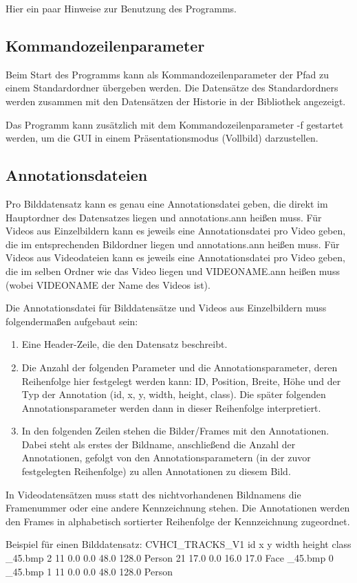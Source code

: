 Hier ein paar Hinweise zur Benutzung des Programms.

\subsection{Kommandozeilenparameter}
Beim Start des Programms kann als Kommandozeilenparameter der Pfad zu einem Standardordner übergeben werden. Die Datensätze des Standardordners werden zusammen mit den Datensätzen der Historie in der Bibliothek angezeigt.

Das Programm kann zusätzlich mit dem Kommandozeilenparameter -f gestartet werden, um die GUI in einem Präsentationsmodus (Vollbild) darzustellen.

\subsection{Annotationsdateien}
Pro Bilddatensatz kann es genau eine Annotationsdatei geben, die direkt im Hauptordner des Datensatzes liegen und annotations.ann heißen muss. \newline
Für Videos aus Einzelbildern kann es jeweils eine Annotationsdatei pro Video geben, die im entsprechenden Bildordner liegen und annotations.ann heißen muss. \newline
Für Videos aus Videodateien kann es jeweils eine Annotationsdatei pro Video geben, die im selben Ordner wie das Video liegen und VIDEONAME.ann heißen muss (wobei VIDEONAME der Name des Videos ist).

Die Annotationsdatei für Bilddatensätze und Videos aus Einzelbildern muss folgendermaßen aufgebaut sein:
\begin{enumerate}
\item Eine Header-Zeile, die den Datensatz beschreibt.
\item Die Anzahl der folgenden Parameter und die Annotationsparameter, deren Reihenfolge hier festgelegt werden kann: ID, Position, Breite, Höhe und der Typ der Annotation (id, x, y, width, height, class). Die später folgenden Annotationsparameter werden dann in dieser Reihenfolge interpretiert.
\item In den folgenden Zeilen stehen die Bilder/Frames mit den Annotationen. Dabei steht als erstes der Bildname, anschließend die Anzahl der Annotationen, gefolgt von den Annotationsparametern (in der zuvor festgelegten Reihenfolge) zu allen Annotationen zu diesem Bild.
\end{enumerate}

In Videodatensätzen muss statt des nichtvorhandenen Bildnamens die Framenummer oder eine andere Kennzeichnung stehen. Die Annotationen werden den Frames in alphabetisch sortierter Reihenfolge der Kennzeichnung zugeordnet.

Beispiel für einen Bilddatensatz: \newline\newline
CVHCI\_TRACKS\_V1  id x y width height class \_45.bmp 2 11 0.0 0.0 48.0 128.0 Person 21 17.0 0.0 16.0 17.0 Face \_45.bmp 0 \_45.bmp 1 11 0.0 0.0 48.0 128.0 Person \newline
